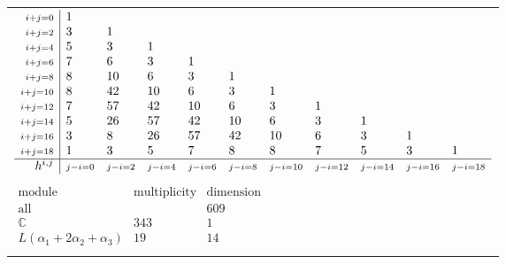 \documentclass[crop,border=2mm]{standalone}
\begin{document}
\begin{tabular}{l}
$\displaystyle
\begin{array}{r|l l l l l l l l l l}
	{\scriptstyle i+j=0}&1&&&&&&&&&\\
	{\scriptstyle i+j=2}&3&1&&&&&&&&\\
	{\scriptstyle i+j=4}&5&3&1&&&&&&&\\
	{\scriptstyle i+j=6}&7&6&3&1&&&&&&\\
	{\scriptstyle i+j=8}&8&10&6&3&1&&&&&\\
	{\scriptstyle i+j=10}&8&42&10&6&3&1&&&&\\
	{\scriptstyle i+j=12}&7&57&42&10&6&3&1&&&\\
	{\scriptstyle i+j=14}&5&26&57&42&10&6&3&1&&\\
	{\scriptstyle i+j=16}&3&8&26&57&42&10&6&3&1&\\
	{\scriptstyle i+j=18}&1&3&5&7&8&8&7&5&3&1\\
	\hline h^{i,j}&{\scriptstyle j-i=0}&{\scriptstyle j-i=2}&{\scriptstyle j-i=4}&{\scriptstyle j-i=6}&{\scriptstyle j-i=8}&{\scriptstyle j-i=10}&{\scriptstyle j-i=12}&{\scriptstyle j-i=14}&{\scriptstyle j-i=16}&{\scriptstyle j-i=18}
\end{array}
$ \\ \\


$\displaystyle
\begin{array}{rll}
	\text{module}&\text{multiplicity}&\text{dimension} \\ \hline \text{all}&&609 \\
	\mathbb{C}&343&1\\
	L\left(\alpha_{1}+ 2\alpha_{2}+\alpha_{3}\right)&19&14
\end{array}
$ \\ \\

\end{tabular}
\end{document}
